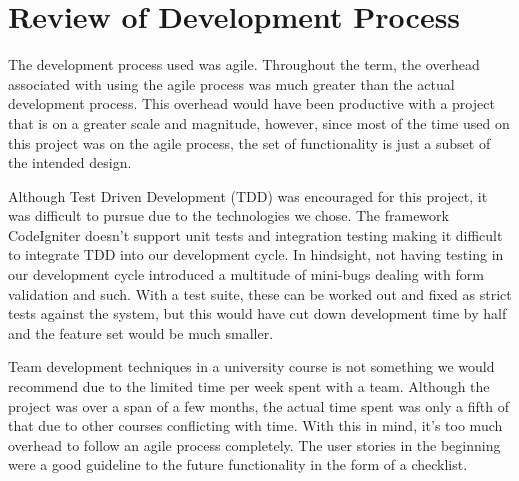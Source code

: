 \documentclass[12pt]{article}
\begin{document}
\section{Review of Development Process}

The development process used was agile. Throughout the term, the overhead
associated with using the agile process was much greater than the actual
development process. This overhead would have been productive with a project
that is on a greater scale and magnitude, however, since most of the time used
on this project was on the agile process, the set of functionality is just a
subset of the intended design.

Although Test Driven Development (TDD) was encouraged for this project, it was
difficult to pursue due to the technologies we chose. The framework CodeIgniter
doesn't support unit tests and integration testing making it difficult to
integrate TDD into our development cycle. In hindsight, not having testing in
our development cycle introduced a multitude of mini-bugs dealing with form
validation and such. With a test suite, these can be worked out and fixed as
strict tests against the system, but this would have cut down development time
by half and the feature set would be much smaller.

Team development techniques in a university course is not something we would
recommend due to the limited time per week spent with a team. Although the
project was over a span of a few months, the actual time spent was only a fifth
of that due to other courses conflicting with time. With this in mind, it's too
much overhead to follow an agile process completely. The user stories in the
beginning were a good guideline to the future functionality in the form of a
checklist.
\end{document}
